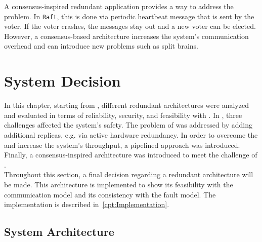 A consensus-inspired redundant application provides a way to address the \ChallengeVoter problem.
In \texttt{Raft}, this is done via periodic heartbeat message that is sent by the voter.
If the voter crashes, the messages stay out and a new voter can be elected.
However, a consensus-based architecture increases the system's communication overhead and can introduce new problems such as split brains.


\section{System Decision}
In this chapter, starting from , different redundant architectures were analyzed and evaluated in terms of reliability, security, and feasibility with .
In , three challenges affected the system's safety.
The problem of \ChallengeWR was addressed by adding additional replicas, e.g. via active hardware redundancy.
In order to overcome the \ChallengeThrough and increase the system's throughput, a pipelined approach was introduced.
Finally, a consensus-inspired architecture was introduced to meet the challenge of \ChallengeVoter.
\\

Throughout this section, a final decision regarding a redundant architecture will be made.
This architecture is implemented to show its feasibility with the  communication model and its consistency with the fault model.
The implementation is described in~\autoref{cpt:Implementation}.

\subsection{System Architecture}
\label{subsec:SystemArchitecture}

